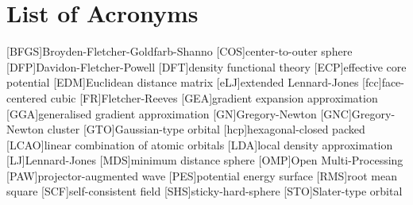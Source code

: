 
\chapter*{List of Acronyms}

\begin{acronym}[ABCDEFGHIJK]
    [BFGS]{Broyden-Fletcher-Goldfarb-Shanno}
    [COS]{center-to-outer sphere}
    [DFP]{Davidon-Fletcher-Powell}
    [DFT]{density functional theory}
    [ECP]{effective core potential}
    [EDM]{Euclidean distance matrix}
    [eLJ]{extended Lennard-Jones}
    [fcc]{face-centered cubic}
    [FR]{Fletcher-Reeves}
	[GEA]{gradient expansion approximation}
	[GGA]{generalised gradient approximation}
    [GN]{Gregory-Newton}
    [GNC]{Gregory-Newton cluster}
    [GTO]{Gaussian-type orbital}
    [hcp]{hexagonal-closed packed}
    [LCAO]{linear combination of atomic orbitals}
    [LDA]{local density approximation}
    [LJ]{Lennard-Jones}
    [MDS]{minimum distance sphere}
    [OMP]{Open Multi-Processing}
    [PAW]{projector-augmented wave}
    [PES]{potential energy surface}
    [RMS]{root mean square}
    [SCF]{self-consistent field}
    [SHS]{sticky-hard-sphere}
    [STO]{Slater-type orbital}
\end{acronym}
